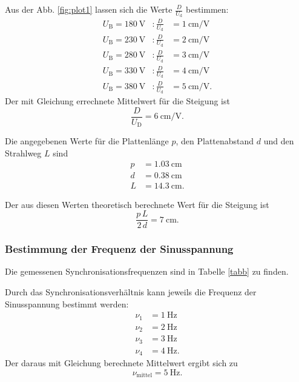 \noindent Aus der Abb. \ref{fig:plot1} lassen sich die Werte 
$\frac{D}{U_\text{d}}$ bestimmen:
\begin{align*} 
    U_\text{B} = \SI{180}{\volt} &: \frac{D}{U_\text{d}} &= \SI{1}{\centi\meter\per\volt} \\
    U_\text{B} = \SI{230}{\volt} &: \frac{D}{U_\text{d}} &= \SI{2}{\centi\meter\per\volt} \\
    U_\text{B} = \SI{280}{\volt} &: \frac{D}{U_\text{d}} &= \SI{3}{\centi\meter\per\volt} \\
    U_\text{B} = \SI{330}{\volt} &: \frac{D}{U_\text{d}} &= \SI{4}{\centi\meter\per\volt} \\
    U_\text{B} = \SI{380}{\volt} &: \frac{D}{U_\text{d}} &= \SI{5}{\centi\meter\per\volt}.
\end{align*} %
Der mit Gleichung %
errechnete Mittelwert für die Steigung ist
\begin{equation*}
    \frac{D}{U_\text{D}} = \SI{6}{\centi\meter\per\volt}.
\end{equation*}


\noindent Die angegebenen Werte für die Plattenlänge $p$,
den Plattenabstand $d$ und den Strahlweg $L$ sind
\begin{align*}
    p &= \SI{1.03}{\centi\meter} \\
    d &= \SI{0.38}{\centi\meter} \\
    L &= \SI{14.3}{\centi\meter}.
\end{align*}

Der aus diesen Werten theoretisch berechnete Wert für die
Steigung ist
\begin{equation*}
    \frac{p \, L}{2 \, d} = \SI{7}{\centi\meter}.
\end{equation*}

\subsubsection{Bestimmung der Frequenz der Sinusspannung}
Die gemessenen Synchronisationsfrequenzen sind in Tabelle
\ref{tabb} zu finden. 


\noindent Durch das Synchronisationsverhältnis
kann jeweils die Frequenz der Sinusspannung bestimmt werden:
\begin{align*}
    \nu_1 &= \SI{1}{\hertz} \\
    \nu_2 &= \SI{2}{\hertz} \\
    \nu_3 &= \SI{3}{\hertz} \\
    \nu_4 &= \SI{4}{\hertz}.
\end{align*}
Der daraus mit Gleichung
berechnete Mittelwert ergibt sich zu
\begin{equation*}
    \nu_\text{mittel} = \SI{5}{\hertz}.
\end{equation*}



